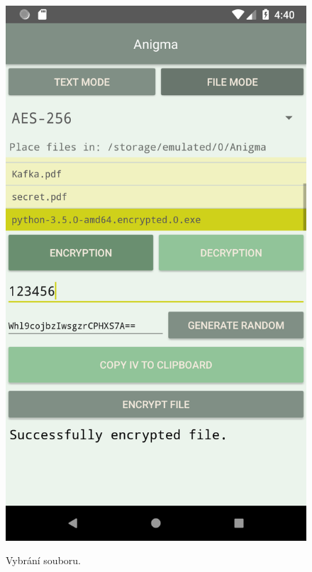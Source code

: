 \documentclass[12pt, a4paper]{article}
\begin{document}
\begin{figure}[h]
\caption{Vybrání souboru.}
\centering
\includegraphics[height=0.4\textheight]{file_chosen}
\label{fig:file_chosen}
\end{figure}
\end{document}
